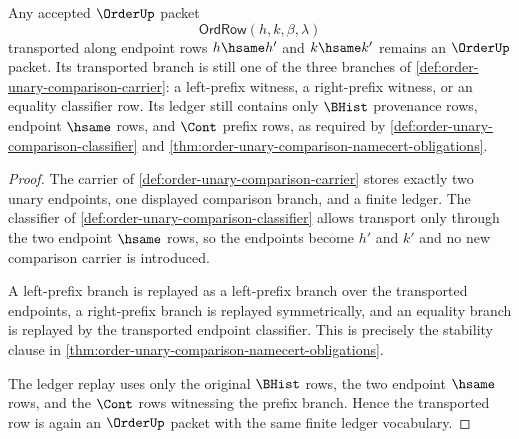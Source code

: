 \begin{theorem}
\label{thm:order-endpoint-transport-obligation}
Any accepted $\OrderUp$ packet
$$
\mathsf{OrdRow}(h,k,\beta,\lambda)
$$
transported along endpoint rows $h\hsame h'$ and $k\hsame k'$ remains an $\OrderUp$ packet. Its transported branch is still one of the three branches of \autoref{def:order-unary-comparison-carrier}: a left-prefix witness, a right-prefix witness, or an equality classifier row. Its ledger still contains only $\BHist$ provenance rows, endpoint $\hsame$ rows, and $\Cont$ prefix rows, as required by \autoref{def:order-unary-comparison-classifier} and \autoref{thm:order-unary-comparison-namecert-obligations}.
\end{theorem}
\begin{proof}
The carrier of \autoref{def:order-unary-comparison-carrier} stores exactly two unary endpoints, one displayed comparison branch, and a finite ledger. The classifier of \autoref{def:order-unary-comparison-classifier} allows transport only through the two endpoint $\hsame$ rows, so the endpoints become $h'$ and $k'$ and no new comparison carrier is introduced.

A left-prefix branch is replayed as a left-prefix branch over the transported endpoints, a right-prefix branch is replayed symmetrically, and an equality branch is replayed by the transported endpoint classifier. This is precisely the stability clause in \autoref{thm:order-unary-comparison-namecert-obligations}.

The ledger replay uses only the original $\BHist$ rows, the two endpoint $\hsame$ rows, and the $\Cont$ rows witnessing the prefix branch. Hence the transported row is again an $\OrderUp$ packet with the same finite ledger vocabulary.
\end{proof}

